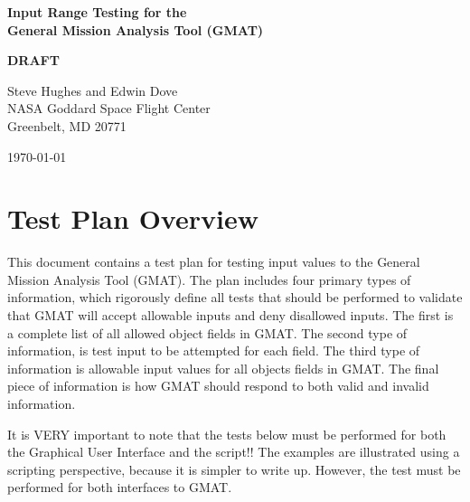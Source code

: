 \documentclass[10 pt]{book}
\begin{document}
\thispagestyle{empty}

\begin{center}
{\renewcommand{\thefootnote}{\fnsymbol{footnote}} { \huge \bf
Input Range Testing for the \\General Mission Analysis Tool (GMAT) \\
}}
\end{center}
\begin{center}
{\renewcommand{\thefootnote}{\fnsymbol{footnote}} { \Huge \bf
 DRAFT }}
\end{center}

\begin{figure}[htbp!]
    \begin{center}
    \end{center}
\end{figure}

\begin{center}
Steve Hughes and Edwin Dove\\

NASA Goddard Space Flight Center\\
Greenbelt, MD 20771

\today
\end{center}

\clearpage \clearpage



\tableofcontents \listoftables

\chapter{Test Plan Overview}

This document contains a test plan for testing input values to the
General Mission Analysis Tool (GMAT).  The plan includes four
primary types of information, which rigorously define all tests that
should be performed to validate that GMAT will accept allowable
inputs and deny disallowed inputs. The first is a complete list of
all allowed object fields in GMAT. The second type of information,
is test input to be attempted for each field. The third type of
information is allowable input values for all objects fields in
GMAT.  The final piece of information is how GMAT should respond to
both valid and invalid information.

It is VERY important to note that the tests below must be performed
for both the Graphical User Interface and the script!!  The examples
are illustrated using a scripting perspective, because it is simpler
to write up.  However, the test must be performed for both
interfaces to GMAT.
\end{document}
